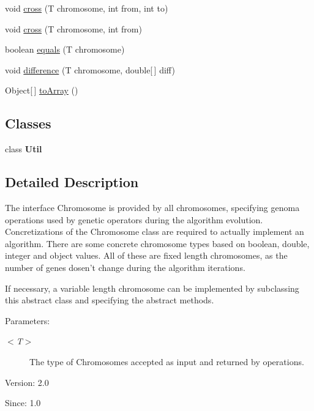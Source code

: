\begin{CompactItemize}
\item 
void \hyperlink{interfacejenes_1_1chromosome_1_1_chromosome_3_01_t_01extends_01_chromosome_01_4_3865a9034e0582dc11b6dc6cbd9b21da}{cross} (T chromosome, int from, int to)
\item 
void \hyperlink{interfacejenes_1_1chromosome_1_1_chromosome_3_01_t_01extends_01_chromosome_01_4_56f3d45ef9dced649f9050d736e6e753}{cross} (T chromosome, int from)
\item 
boolean \hyperlink{interfacejenes_1_1chromosome_1_1_chromosome_3_01_t_01extends_01_chromosome_01_4_fa9dc889ff75457240750c802a5024db}{equals} (T chromosome)
\item 
void \hyperlink{interfacejenes_1_1chromosome_1_1_chromosome_3_01_t_01extends_01_chromosome_01_4_7f4ba26864bc54607635b608be6a1e1d}{difference} (T chromosome, double\mbox{[}$\,$\mbox{]} diff)
\item 
Object\mbox{[}$\,$\mbox{]} \hyperlink{interfacejenes_1_1chromosome_1_1_chromosome_3_01_t_01extends_01_chromosome_01_4_af3edb9b3b7265edf5e754ca2b41603e}{toArray} ()
\end{CompactItemize}
\subsection*{Classes}
\begin{CompactItemize}
\item 
class \textbf{Util}
\end{CompactItemize}


\subsection{Detailed Description}
The interface Chromosome is provided by all chromosomes, specifying genoma operations used by genetic operators during the algorithm evolution. Concretizations of the Chromosome class are required to actually implement an algorithm. There are some concrete chromosome types based on boolean, double, integer and object values. All of these are fixed length chromosomes, as the number of genes dosen't change during the algorithm iterations. 

If necessary, a variable length chromosome can be implemented by subclassing this abstract class and specifying the abstract methods.

\begin{Desc}
\item[Parameters:]
\begin{description}
\item[{\em $<$T$>$}]The type of Chromosomes accepted as input and returned by operations.\end{description}
\end{Desc}
\begin{Desc}
\item[Version:]2.0 \end{Desc}
\begin{Desc}
\item[Since:]1.0 \end{Desc}


